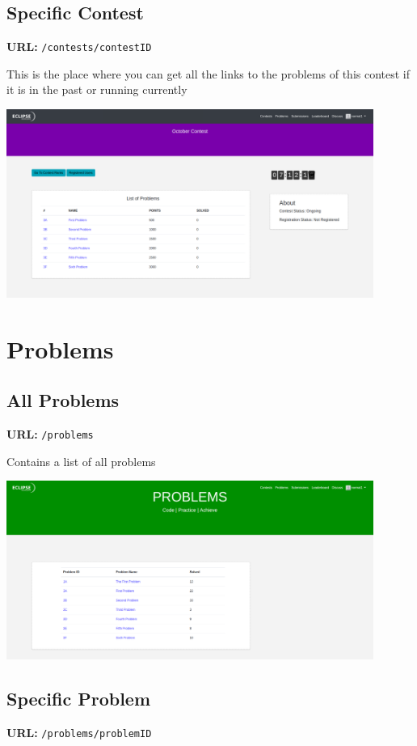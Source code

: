 \documentclass[hidelinks, a4paper,12pt, titlepage]{article}
\begin{document}
\subsection{Specific Contest}
\textbf{URL:} \texttt{/contests/contestID}

This is the place where you can get all the links to the problems of this contest if it is in the past or running currently
\begin{center}\includegraphics[width=0.9\textwidth]{runningcontest.png}\end{center}
 
\newpage

\section{Problems}
\subsection{All Problems}
\textbf{URL:} \texttt{/problems}

Contains a list of all problems
\begin{center}\includegraphics[width=0.9\textwidth]{allproblems.png}\end{center}
 
\subsection{Specific Problem}
\textbf{URL:} \texttt{/problems/problemID}
\end{document}
